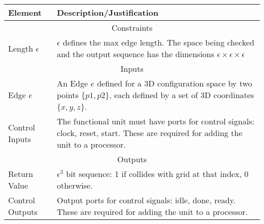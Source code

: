 \begin{table}[H]
\begin{center}
\begin{tabular}{|p{.2\linewidth}|p{.74\linewidth}|}
    \hline
    \textbf{Element}             & \textbf{Description/Justification} \\
    \hline
    \multicolumn{2}{|c|}{Constraints} \\
    \hline
    Length $\epsilon$  & $\epsilon$ defines the max edge length. The space being checked and the output sequence has the dimensions $\epsilon\times\epsilon\times\epsilon$ \\
    \hline
    \multicolumn{2}{|c|}{Inputs} \\
    \hline
    Edge $e$  & An Edge $e$ defined for a \gls{3D} \gls{configuration} space by two points $\{p1, p2\}$, each defined by a set of \gls{3D} coordinates $\{x,y,z\}$.\\
    \hline
    Control Inputs & The functional unit must have ports for control signals: clock, reset, start. These are required for adding the unit to a processor. \\
    \hline
    \multicolumn{2}{|c|}{Outputs} \\ 
    \hline
    Return Value & $\epsilon^3$ bit sequence: 1 if collides with grid at that index, 0 otherwise.\\
    \hline
    Control Outputs & Output ports for control signals: idle, done, ready. These are required for adding the unit to a processor. \\
    \hline
\end{tabular}
\label{table:edg_col_interface_specs}
\end{center}
\end{table}